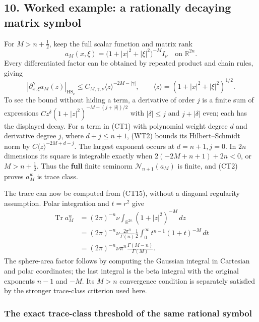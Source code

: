 \documentclass[
  11pt,
]{article}
\begin{document}
\subsection{10. Worked example: a rationally decaying matrix
symbol}\label{worked-example-a-rationally-decaying-matrix-symbol}

For \(M>n+\tfrac12\), keep the full scalar function and matrix rank \[
 a_M(x,\xi)
   =\bigl(1+|x|^2+|\xi|^2\bigr)^{-M}I_\nu
   \quad\text{on }\mathbb R^{2n}.
 \tag{WT1}
\] Every differentiated factor can be obtained by repeated product and
chain rules, giving \[
 |\partial_{x,\xi}^{\gamma}a_M(z)|_{\mathrm{HS}_\nu}
   \le C_{M,\gamma,\nu}\langle z\rangle^{-2M-|\gamma|},
 \qquad \langle z\rangle=(1+|x|^2+|\xi|^2)^{1/2}.
 \tag{WT2}
\] To see the bound without hiding a term, a derivative of order \(j\)
is a finite sum of expressions
\(Cz^\delta(1+|z|^2)^{-M-(j+|\delta|)/2}\) with \(|\delta|\le j\) and
\(j+|\delta|\) even; each has the displayed decay. For a term in (CT1)
with polynomial weight degree \(d\) and derivative degree \(j\), where
\(d+j\le n+1\), (WT2) bounds its Hilbert--Schmidt norm by
\(C\langle z\rangle^{-2M+d-j}\). The largest exponent occurs at
\(d=n+1,j=0\). In \(2n\) dimensions its square is integrable exactly
when \(2(-2M+n+1)+2n<0\), or \(M>n+\tfrac12\). Thus the \textbf{full}
finite seminorm \(\mathcal N_{n+1}(a_M)\) is finite, and (CT2) proves
\(a_M^w\) is trace class.

The trace can now be computed from (CT15), without a diagonal regularity
assumption. Polar integration and \(t=r^2\) give \[
 \begin{aligned}
 \operatorname{Tr}a_M^w
  &=(2\pi)^{-n}\nu
      \int_{\mathbb R^{2n}}(1+|z|^2)^{-M}\,dz\\
  &=(2\pi)^{-n}\nu
      \frac{2\pi^n}{\Gamma(n)}
      \frac12\int_0^\infty t^{n-1}(1+t)^{-M}\,dt\\
  &=(2\pi)^{-n}\nu\pi^n
      \frac{\Gamma(M-n)}{\Gamma(M)} .
 \end{aligned}
 \tag{WT3}
\] The sphere-area factor follows by computing the Gaussian integral in
Cartesian and polar coordinates; the last integral is the beta integral
with the original exponents \(n-1\) and \(-M\). Its \(M>n\) convergence
condition is separately satisfied by the stronger trace-class criterion
used here.

\subsubsection{The exact trace-class threshold of the same rational
symbol}\label{the-exact-trace-class-threshold-of-the-same-rational-symbol}
\end{document}
